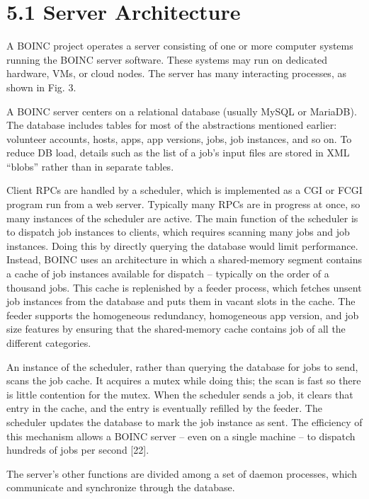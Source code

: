 \documentclass[
]{article}
\begin{document}
\section{5.1 Server Architecture}\label{server-architecture}

A BOINC project operates a server consisting of one or more computer
systems running the BOINC server software. These systems may run on
dedicated hardware, VMs, or cloud nodes. The server has many interacting
processes, as shown in Fig. 3.

A BOINC server centers on a relational database (usually MySQL or
MariaDB). The database includes tables for most of the abstractions
mentioned earlier: volunteer accounts, hosts, apps, app versions, jobs,
job instances, and so on. To reduce DB load, details such as the list of
a job's input files are stored in XML ``blobs'' rather than in separate
tables.

Client RPCs are handled by a scheduler, which is implemented as a CGI or
FCGI program run from a web server. Typically many RPCs are in progress
at once, so many instances of the scheduler are active. The main
function of the scheduler is to dispatch job instances to clients, which
requires scanning many jobs and job instances. Doing this by directly
querying the database would limit performance. Instead, BOINC uses an
architecture in which a shared-memory segment contains a cache of job
instances available for dispatch -- typically on the order of a thousand
jobs. This cache is replenished by a feeder process, which fetches
unsent job instances from the database and puts them in vacant slots in
the cache. The feeder supports the homogeneous redundancy, homogeneous
app version, and job size features by ensuring that the shared-memory
cache contains job of all the different categories.

An instance of the scheduler, rather than querying the database for jobs
to send, scans the job cache. It acquires a mutex while doing this; the
scan is fast so there is little contention for the mutex. When the
scheduler sends a job, it clears that entry in the cache, and the entry
is eventually refilled by the feeder. The scheduler updates the database
to mark the job instance as sent. The efficiency of this mechanism
allows a BOINC server -- even on a single machine -- to dispatch
hundreds of jobs per second {[}22{]}.

The server's other functions are divided among a set of daemon
processes, which communicate and synchronize through the database.
\end{document}
